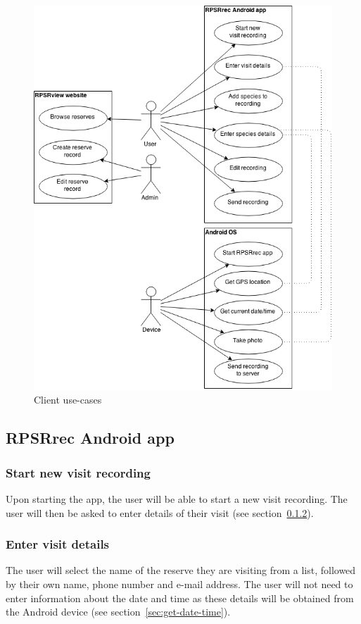 \documentclass[12pt]{article}
\begin{document}
	\begin{figure}[H]
		\begin{center}
			\includegraphics[scale=0.5]{use-cases}
		\end{center}
		\caption{Client use-cases}
		\label{fig:use-case-diagram}
	\end{figure}

	\subsection{RPSRrec Android app}
		\subsubsection{Start new visit recording}
			Upon starting the app, the user will be able to start a new visit recording. The user will then be asked to enter details of their visit (see section~\ref{sec:enter-visit-details}).
		\subsubsection{Enter visit details}
			\label{sec:enter-visit-details}
			The user will select the name of the reserve they are visiting from a list, followed by their own name, phone number and e-mail address. The user will not need to enter information about the date and time as these details will be obtained from the Android device (see section~\ref{sec:get-date-time}).
\end{document}
